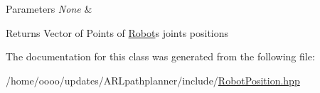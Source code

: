 \begin{DoxyParams}{Parameters}
{\em None} & \\
\hline
\end{DoxyParams}
\begin{DoxyReturn}{Returns}
Vector of Points of \hyperlink{classRobot}{Robot}\textquotesingle{}s joints positions 
\end{DoxyReturn}


The documentation for this class was generated from the following file\+:\begin{DoxyCompactItemize}
\item 
/home/oooo/updates/\+A\+R\+Lpathplanner/include/\hyperlink{RobotPosition_8hpp}{Robot\+Position.\+hpp}\end{DoxyCompactItemize}
